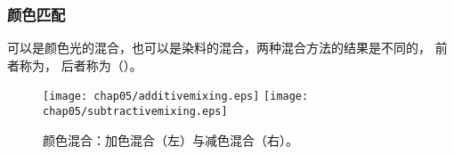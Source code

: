 \subsubsection*{颜色匹配}
可以是颜色光的混合，也可以是染料的混合，两种混合方法的结果是不同的，
前者称为，
后者称为（）。
\begin{figure}[htbp]
      \centering
      \texttt{[image: chap05/additivemixing.eps]}
      \texttt{[image: chap05/subtractivemixing.eps]}
      \caption{颜色混合：加色混合（左）与减色混合（右）。}
      \label{fig:5.ex06}
\end{figure}
